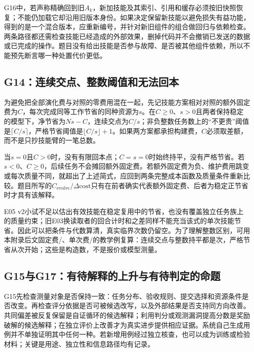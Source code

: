 \leavevmode{}\label{sol:g16}G16中，若声称精确回到旧$A_k$，新加技能及其索引、引用和缓存必须按旧快照恢复；不能仍加载它却沿用旧版本身份。如果决定保留新技能以避免损失有益功能，得到的是一个混合版本，应重新编号，并针对新旧组件的组合做回归与依赖检查。两条路径都还需检查技能已经造成的外部效果，删掉代码并不会撤销已发送的数据或已完成的操作。题目没有给出技能是否参与故障、是否被其他组件依赖，所以不能预先断言哪一种处置代价更低。

\subsection{G14：连续交点、整数阈值和无法回本}\label{sol:g14}

为避免把全部演化费与对照的零费用混在一起，先记技能方案相对对照的额外固定费为$C$，每次完成同等工作节省的同种资源为$s$。在$C\ge0$、$s>0$且两者保持稳定的模型下，净节省为$Ns-C$，连续交点为$C/s$；非负整数任务数上的“不更贵”阈值是$\lceil C/s\rceil$，严格节省阈值是$\lfloor C/s\rfloor+1$。如果两方案都承担构建费，$C$必须取差额，而不是只抄技能臂的一笔总数。

当$s=0$且$C>0$时，没有有限回本点；$C=s=0$时始终持平，没有严格节省。若$s<0$、$C\ge0$，后续任务不会摊回额外固定费。若额外固定费为负、维护费用跳变或每次质量不同，就超出了上述简式，应回到两条完整成本函数及质量条件重新比较。题目所写的$C_{\text{evolve}}/\Delta\text{cost}$只有在前者确实代表额外固定费、后者为稳定正节省时才具有该解释。

E05 v2小试不足以估出有效技能在稳定复用中的节省，也没有覆盖独立任务族上的质量约束；旧E03换读取者的回合计时和之差同样不能充当该式的单次技能节省。因此可以把条件与代数算清，真实临界次数仍留空。为了理解整数区别，可用本附录后文固定费/、单次费/的教学例复算：连续交点与整数持平都是次，严格节省从次开始；这些是构造数，不是报价或模型测量。

\subsection{G15与G17：有待解释的上升与有待判定的命题}\label{sol:g15}

G15先检查测量对象是否保持一致：任务分布、验收规则、提交选择和资源条件是否改变。再检查评分依据是否可被候选改写，以及外部结果是否支持同方向改善。共同偏差被反复保留是自证循环的候选解释；利用判分或观测漏洞提高分数是奖励破解的候选解释；在独立评价上改善才为真实进步提供相应证据。系统自己生成用例并不单独证明其中任何一种。若新增用例经过独立核查，也可以成为训练或检验材料；关键是用途、独立性和信息路径均有记录。

